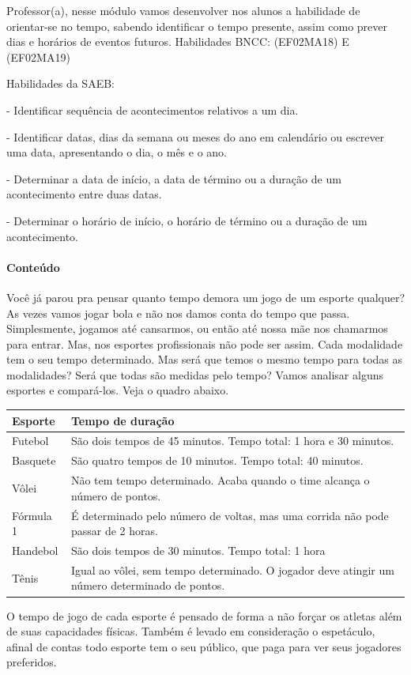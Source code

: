 Professor(a), nesse módulo vamos desenvolver nos alunos a habilidade de
orientar-se no tempo, sabendo identificar o tempo presente, assim como
prever dias e horários de eventos futuros. Habilidades BNCC: (EF02MA18)
E (EF02MA19)

Habilidades da SAEB:

- Identificar sequência de acontecimentos relativos a um dia.

- Identificar datas, dias da semana ou meses do ano em calendário ou
escrever uma data, apresentando o dia, o mês e o ano.

- Determinar a data de início, a data de término ou a duração de um
acontecimento entre duas datas.

- Determinar o horário de início, o horário de término ou a duração de
um acontecimento.

\paragraph{Conteúdo}\label{conteuxfado-3}

Você já parou pra pensar quanto tempo demora um jogo de um esporte
qualquer? As vezes vamos jogar bola e não nos damos conta do tempo que
passa. Simplesmente, jogamos até cansarmos, ou então até nossa mãe nos
chamarmos para entrar. Mas, nos esportes profissionais não pode ser
assim. Cada modalidade tem o seu tempo determinado. Mas será que temos o
mesmo tempo para todas as modalidades? Será que todas são medidas pelo
tempo? Vamos analisar alguns esportes e compará-los. Veja o quadro
abaixo.

\begin{longtable}[]{@{}ll@{}}
\toprule
Esporte & Tempo de duração\tabularnewline
\midrule
\endhead
Futebol & São dois tempos de 45 minutos. Tempo total: 1 hora e 30
minutos.\tabularnewline
Basquete & São quatro tempos de 10 minutos. Tempo total: 40
minutos.\tabularnewline
Vôlei & Não tem tempo determinado. Acaba quando o time alcança o número
de pontos.\tabularnewline
Fórmula 1 & É determinado pelo número de voltas, mas uma corrida não
pode passar de 2 horas.\tabularnewline
Handebol & São dois tempos de 30 minutos. Tempo total: 1
hora\tabularnewline
Tênis & Igual ao vôlei, sem tempo determinado. O jogador deve atingir um
número determinado de pontos.\tabularnewline
\bottomrule
\end{longtable}

O tempo de jogo de cada esporte é pensado de forma a não forçar os
atletas além de suas capacidades físicas. Também é levado em
consideração o espetáculo, afinal de contas todo esporte tem o seu
público, que paga para ver seus jogadores preferidos.


